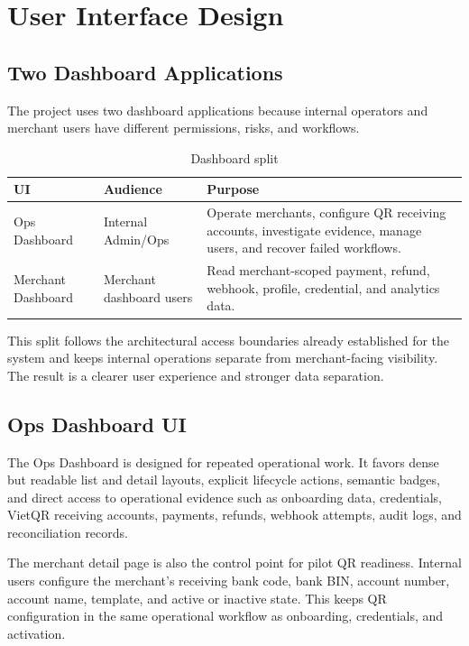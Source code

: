 \chapter{User Interface Design}

\section{Two Dashboard Applications}

The project uses two dashboard applications because internal operators and
merchant users have different permissions, risks, and workflows.

\begin{table}[!htbp]
\centering
\caption{Dashboard split}
\begin{tabularx}{\textwidth}{L{0.24\textwidth}L{0.24\textwidth}Y}
\toprule
\textbf{UI} & \textbf{Audience} & \textbf{Purpose} \\
\midrule
Ops Dashboard & Internal Admin/Ops & Operate merchants, configure QR receiving accounts, investigate evidence, manage users, and recover failed workflows. \\
\bodyrowrule
Merchant Dashboard & Merchant dashboard users & Read merchant-scoped payment, refund, webhook, profile, credential, and analytics data. \\
\bottomrule
\end{tabularx}
\end{table}

This split follows the architectural access boundaries already established for
the system and keeps internal operations separate from merchant-facing
visibility. The result is a clearer user experience and stronger data
separation.

\section{Ops Dashboard UI}

The Ops Dashboard is designed for repeated operational work. It favors dense but
readable list and detail layouts, explicit lifecycle actions, semantic badges,
and direct access to operational evidence such as onboarding data, credentials,
VietQR receiving accounts, payments, refunds, webhook attempts, audit logs, and
reconciliation records.

The merchant detail page is also the control point for pilot QR readiness.
Internal users configure the merchant's receiving bank code, bank BIN, account
number, account name, template, and active or inactive state. This keeps QR
configuration in the same operational workflow as onboarding, credentials, and
activation.


